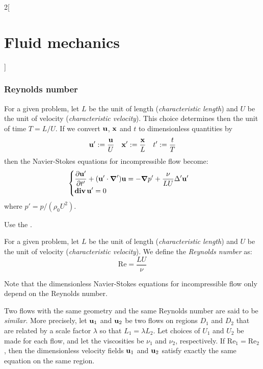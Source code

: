 \documentclass[../../../main_physics.tex]{subfiles}
\begin{document}
\begin{multicols}{2}[\section{Fluid mechanics}]
  \subsubsection{Reynolds number}
  \begin{proposition}
    For a given problem, let $L$ be the unit of length (\emph{characteristic length}) and $U$ be the unit of velocity (\emph{characteristic velocity}). This choice determines then the unit of time $T=L/U$. If we convert $\boldsymbol{\mathrm{u}}$, $\boldsymbol{\mathrm{x}}$ and $t$ to dimensionless quantities by
    $$
      \boldsymbol{\mathrm{u}}':= \frac{\boldsymbol{\mathrm{u}}}{U}\quad \boldsymbol{\mathrm{x}}':=\frac{\boldsymbol{\mathrm{x}}}{L}\quad t':=\frac{t}{T}
    $$
    then the Navier-Stokes equations for incompressible flow become:
    $$
      \begin{cases}
        \displaystyle\pdv{\boldsymbol{\mathrm{u}}'}{t'}+(\boldsymbol{\mathrm{u}}'\cdot\grad')\boldsymbol{\mathrm{u}}=-\grad p' + \frac{\nu}{LU}\Delta'\boldsymbol{\mathrm{u}}' \\
        \displaystyle\operatorname{\boldsymbol{\mathrm{div}}}\boldsymbol{\mathrm{u}}'=0
      \end{cases}
    $$
    where $p'=p/(\rho_0 U^2)$.
  \end{proposition}
  \begin{sproof}
    Use the .
  \end{sproof}
  \begin{definition}
    For a given problem, let $L$ be the unit of length (\emph{characteristic length}) and $U$ be the unit of velocity (\emph{characteristic velocity}). We define the \emph{Reynolds number} as:
    $$
      \mathrm{Re}=\frac{LU}{\nu}
    $$
  \end{definition}
  \begin{remark}
    Note that the dimensionless Navier-Stokes equations for incompressible flow only depend on the Reynolds number.
  \end{remark}
  \begin{definition}
    Two flows with the same geometry and the same Reynolds number are said to be \emph{similar}. More precisely, let $\boldsymbol{\mathrm{u}}_1$ and $\boldsymbol{\mathrm{u}}_2$ be two flows on regions $D_1$
    and $D_2$ that are related by a scale factor $\lambda$ so that $L_1 = \lambda L_2$. Let choices
    of $U_1$ and $U_2$ be made for each flow, and let the viscosities be $\nu_1$ and $\nu_2$, respectively. If $\mathrm{Re}_1=\mathrm{Re}_2$, then the dimensionless velocity fields $\boldsymbol{\mathrm{u}}_1$ and $\boldsymbol{\mathrm{u}}_2$ satisfy exactly the same equation on the same region.
  \end{definition}
\end{multicols}
\end{document}
